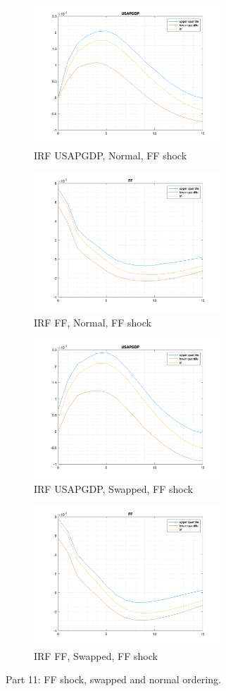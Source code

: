 \documentclass[10pt,letter]{article}
\begin{document}
\begin{figure}
\centering
\begin{subfigure}[b]{0.45\textwidth}
\includegraphics[width=7cm]{ps9fig12}
\caption{IRF USAPGDP, Normal, FF shock}
\end{subfigure}
\hfill
\begin{subfigure}[b]{0.45\textwidth}
\includegraphics[width=7cm]{ps9fig12_2}
\caption{IRF FF, Normal, FF shock}
\end{subfigure}
\begin{subfigure}[b]{0.45\textwidth}
\includegraphics[width=7cm]{ps9fig12_3}
\caption{IRF USAPGDP, Swapped, FF shock}
\end{subfigure}
\hfill
\begin{subfigure}[b]{0.45\textwidth}
\includegraphics[width=7cm]{ps9fig12_4}
\caption{IRF FF, Swapped, FF shock}
\end{subfigure}
\caption{Part 11: FF shock, swapped and normal ordering.}
\end{figure}
\end{document}
